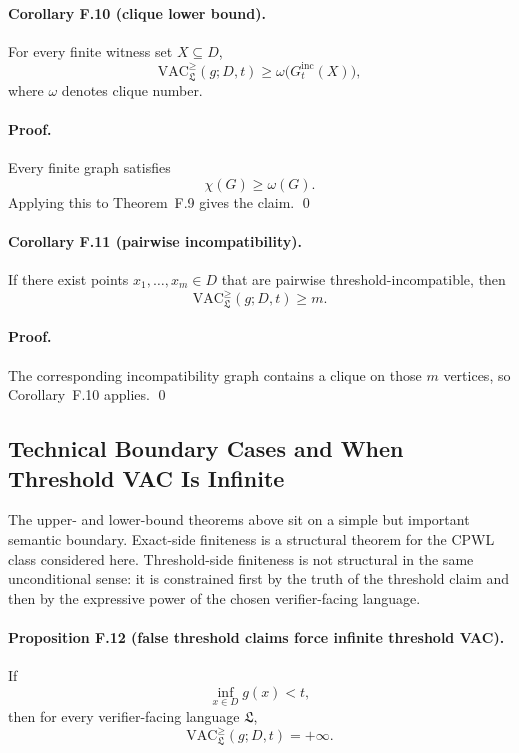 \paragraph{Corollary F.10 (clique lower bound).}
For every finite witness set $X\subseteq D$,
\[
\mathrm{VAC}^{\ge}_{\mathfrak L}(g;D,t)
\ge
\omega\bigl(G_t^{\mathrm{inc}}(X)\bigr),
\]
where $\omega$ denotes clique number.

\paragraph{Proof.}
Every finite graph satisfies
\[
\chi(G)\ge \omega(G).
\]
Applying this to Theorem~F.9 gives the claim. \qed

\paragraph{Corollary F.11 (pairwise incompatibility).}
If there exist points $x_1,\dots,x_m\in D$ that are pairwise threshold-incompatible, then
\[
\mathrm{VAC}^{\ge}_{\mathfrak L}(g;D,t)\ge m.
\]

\paragraph{Proof.}
The corresponding incompatibility graph contains a clique on those $m$ vertices, so Corollary~F.10 applies. \qed

\subsection{Technical Boundary Cases and When Threshold VAC Is Infinite}

The upper- and lower-bound theorems above sit on a simple but important semantic boundary. Exact-side finiteness is a structural theorem for the CPWL class considered here. Threshold-side finiteness is not structural in the same unconditional sense: it is constrained first by the truth of the threshold claim and then by the expressive power of the chosen verifier-facing language.

\paragraph{Proposition F.12 (false threshold claims force infinite threshold VAC).}
If
\[
\inf_{x\in D} g(x)<t,
\]
then for every verifier-facing language $\mathfrak L$,
\[
\mathrm{VAC}^{\ge}_{\mathfrak L}(g;D,t)=+\infty.
\]

